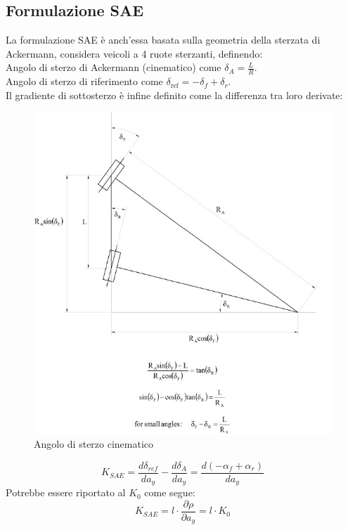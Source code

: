 \subsection{Formulazione SAE}

La formulazione SAE è anch'essa basata sulla geometria della sterzata di Ackermann, considera veicoli a 4 ruote sterzanti,
definendo:\\
Angolo di sterzo di Ackermann (cinematico) come $\delta_A = \frac{L}{R}$.\\ 
Angolo di sterzo di riferimento come $\delta_{\text{ref}} = -\delta_f + \delta_r$.\\
Il gradiente di sottosterzo è infine definito come la differenza tra loro derivate:
\begin{figure}[!h]
    \centering
    \includegraphics[scale=0.7]{Immagini/Understeer Gradient/Ackermann geometry.jpg}
    \caption{Angolo di sterzo cinematico}
    \label{fig:Delta ref}
\end{figure}
\begin{equation}
K_{SAE} = \frac{d\delta_{ref}}{da_y} - \frac{d\delta_A}{da_y} = \frac{d(-\alpha_f + \alpha_r)}{da_y}
\end{equation}
Potrebbe essere riportato al $K_0$ come segue:
\begin{equation}
K_{SAE} = l \cdot \frac{\partial \rho}{\partial a_y} = l \cdot K_0
\end{equation}



